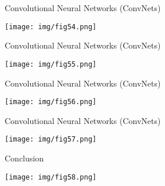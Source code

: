 \documentclass[9pt]{beamer}
\begin{document}
\begin{frame}{Convolutional Neural Networks (ConvNets)}
\begin{center}
	\texttt{[image: img/fig54.png]} 
\end{center}
\end{frame}

\begin{frame}{Convolutional Neural Networks (ConvNets)}
\begin{center}
	\texttt{[image: img/fig55.png]} 
\end{center}
\end{frame}

\begin{frame}{Convolutional Neural Networks (ConvNets)}
\begin{center}
	\texttt{[image: img/fig56.png]} 
\end{center}
\end{frame}

\begin{frame}{Convolutional Neural Networks (ConvNets)}
\begin{center}
	\texttt{[image: img/fig57.png]} 
\end{center}
\end{frame}

\begin{frame}{Conclusion}
\begin{center}
	\texttt{[image: img/fig58.png]} 
\end{center}
\end{frame}
\end{document}

